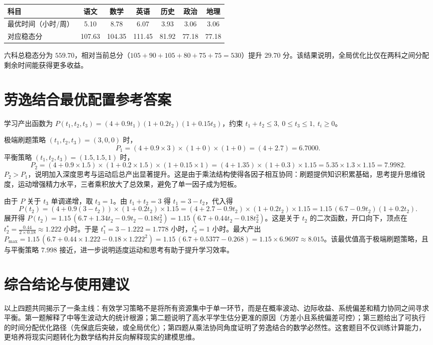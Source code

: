 \documentclass[10pt]{article}
\begin{document}
\begin{center}
\begin{tabular}{lcccccc}
\toprule
科目 & 语文 & 数学 & 英语 & 历史 & 政治 & 地理 \\
\midrule
最优时间（小时/周） & 5.10 & 8.78 & 6.07 & 3.93 & 3.06 & 3.06 \\
对应稳态分 & 107.63 & 104.35 & 111.45 & 81.92 & 77.18 & 77.18 \\
\bottomrule
\end{tabular}
\end{center}
六科总稳态分为 $559.70$，相对当前总分（$105+90+105+80+75+75=530$）提升 $29.70$ 分。该结果说明，全局优化比仅在两科之间分配剩余时间能获得更多收益。

\section{劳逸结合最优配置参考答案}

学习产出函数为 $P(t_1,t_2,t_3)=(4+0.9t_1)(1+0.2t_2)(1+0.15t_3)$，约束 $t_1+t_2\le3,\ 0\le t_3\le1,\ t_i\ge0$。

极端刷题策略 $(t_1,t_2,t_3)=(3,0,0)$ 时，
$$
P_1=(4+0.9\times3)\times(1+0)\times(1+0)=(4+2.7)=6.7000.
$$
平衡策略 $(t_1,t_2,t_3)=(1.5,1.5,1)$ 时，
$$
P_2=(4+0.9\times1.5)\times(1+0.2\times1.5)\times(1+0.15\times1)=(4+1.35)\times(1+0.3)\times1.15=5.35\times1.3\times1.15=7.9982.
$$
$P_2 > P_1$，说明加入深度思考与运动后总产出显著提升。这是由于乘法结构使得各因子相互协同：刷题提供知识积累基础，思考提升思维锐度，运动增强精力水平，三者乘积放大了总效果，避免了单一因子成为短板。

由于 $P$ 关于 $t_3$ 单调递增，取 $t_3=1$。由 $t_1+t_2=3$ 得 $t_1=3-t_2$，代入得
$$
P(t_2)=(4+0.9(3-t_2))\times(1+0.2t_2)\times1.15=(4+2.7-0.9t_2)\times(1+0.2t_2)\times1.15=1.15\,(6.7-0.9t_2)(1+0.2t_2).
$$
展开得 $P(t_2)=1.15\,(6.7+1.34t_2-0.9t_2-0.18t_2^2)=1.15\,(6.7+0.44t_2-0.18t_2^2)$。这是关于 $t_2$ 的二次函数，开口向下，顶点在 $t_2^*=\frac{0.44}{2\times0.18}\approx1.222$ 小时。于是 $t_1^*=3-1.222=1.778$ 小时，$t_3^*=1$ 小时。最大产出 $P_{\max}=1.15\,(6.7+0.44\times1.222-0.18\times1.222^2)=1.15\,(6.7+0.5377-0.268)=1.15\times6.9697\approx8.015$。该最优值高于极端刷题策略，且与平衡策略 $7.998$ 接近，进一步说明适度运动和思考有助于提升学习效率。

\section*{综合结论与使用建议}

以上四题共同揭示了一条主线：有效学习策略不是将所有资源集中于单一环节，而是在概率波动、边际收益、系统偏差和精力协同之间寻求平衡。第一题解释了中等生波动大的统计根源；第二题说明了高水平学生估分更准的原因（方差小且系统偏差可控）；第三题给出了可执行的时间分配优化路径（先保底后突破，或全局优化）；第四题从乘法协同角度证明了劳逸结合的数学必然性。这套题目不仅训练计算能力，更培养将现实问题转化为数学结构并反向解释现实的建模思维。
\end{document}

